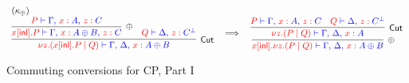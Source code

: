 \begin{figure*}
\[\begin{array}{c}
\\~\\
\multicolumn{1}{l}{(\kappa_{\oplus})} \\
\vcenter{
  \inference{
    \inference{
      \tm{P} \tpvdash \tp{\Gamma \comma \tmof{x}A \comma \tmof{z}C}
    }{\oplus}{
      \tm{x[\inlterm].P} \tpvdash
        \tp{\Gamma \comma \tmof{x}A \oplus B \comma \tmof{z}C}
    }
    &
    \tm{Q} \tpvdash \tp{\Delta \comma \tmof{z}C^\bot}
  }{Cut}{
   \tm{\nu z \Of{C}.(x[\inlterm].P \mid Q)} \tpvdash
     \tp{\Gamma \comma \Delta \comma \tmof{x}A \oplus B}
  }
}
\quad \becomes \quad
\vcenter{
  \inference{
    \inference{
      \tm{P} \tpvdash \tp{\Gamma \comma \tmof{x}A \comma \tmof{z}C}
      &
      \tm{Q} \tpvdash \tp{\Delta \comma \tmof{z}C^\bot}
    }{Cut}{
     \tm{\nu z \Of{C}. (P \mid Q)} \tpvdash
       \tp{\Gamma \comma \Delta \comma \tmof{x}A}
    }
  }{\oplus}{
   \tm{x[\inlterm].\nu z \Of{C}. (P \mid Q)}
     \tpvdash \tp{\Gamma \comma \Delta \comma \tmof{x}A \oplus B}
  }
}

\end{array}
\]

\caption{Commuting conversions for CP, Part I}
\label{fig:commuteone}
\end{figure*}

